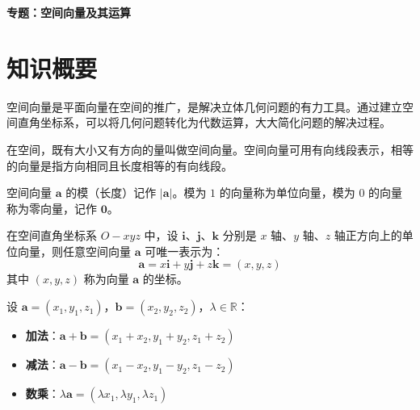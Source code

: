 \documentclass[11pt]{ctexrep}
\begin{document}
\begin{center}
    {\LARGE\bfseries 专题：空间向量及其运算}
\end{center}

\section*{知识概要}

空间向量是平面向量在空间的推广，是解决立体几何问题的有力工具。通过建立空间直角坐标系，可以将几何问题转化为代数运算，大大简化问题的解决过程。

\begin{definition}[空间向量的概念]
    在空间，既有大小又有方向的量叫做空间向量。空间向量可用有向线段表示，相等的向量是指方向相同且长度相等的有向线段。
    
    空间向量 $\boldsymbol{a}$ 的模（长度）记作 $|\boldsymbol{a}|$。模为 $1$ 的向量称为单位向量，模为 $0$ 的向量称为零向量，记作 $\boldsymbol{0}$。
\end{definition}

\begin{definition}[空间向量的坐标表示]
    在空间直角坐标系 $O-xyz$ 中，设 $\boldsymbol{i}$、$\boldsymbol{j}$、$\boldsymbol{k}$ 分别是 $x$ 轴、$y$ 轴、$z$ 轴正方向上的单位向量，则任意空间向量 $\boldsymbol{a}$ 可唯一表示为：
    \[
    \boldsymbol{a} = x\boldsymbol{i} + y\boldsymbol{j} + z\boldsymbol{k} = (x, y, z)
    \]
    其中 $(x, y, z)$ 称为向量 $\boldsymbol{a}$ 的坐标。
\end{definition}

\begin{property}[空间向量的线性运算]
    设 $\boldsymbol{a} = (x_1, y_1, z_1)$，$\boldsymbol{b} = (x_2, y_2, z_2)$，$\lambda \in \mathbb{R}$：
    \begin{itemize}
        \item \textbf{加法}：$\boldsymbol{a} + \boldsymbol{b} = (x_1 + x_2, y_1 + y_2, z_1 + z_2)$
        \item \textbf{减法}：$\boldsymbol{a} - \boldsymbol{b} = (x_1 - x_2, y_1 - y_2, z_1 - z_2)$
        \item \textbf{数乘}：$\lambda\boldsymbol{a} = (\lambda x_1, \lambda y_1, \lambda z_1)$
    \end{itemize}
\end{property}
\end{document}
